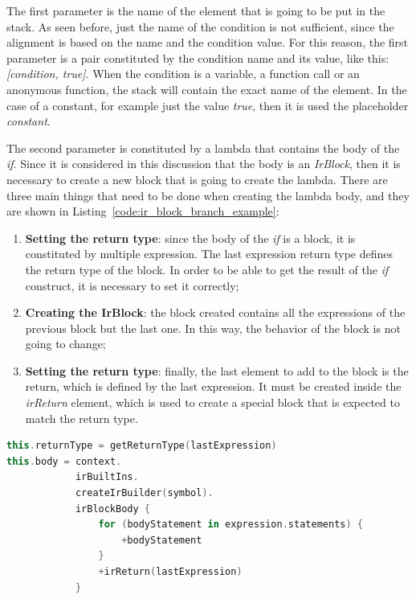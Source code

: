 The first parameter is the name of the element that is going to be put in the stack. As seen before, just the name of the condition is not sufficient, since the alignment is based on the name and the condition value. For this reason, the first parameter is a pair constituted by the condition name and its value, like this: \textit{[condition, true]}.\newline
When the condition is a variable, a function call or an anonymous function, the stack will contain the exact name of the element. In the case of a constant, for example just the value \textit{true}, then it is used the placeholder \textit{constant}.

The second parameter is constituted by a lambda that contains the body of the \textit{if}. Since it is considered in this discussion that the body is an \textit{IrBlock}, then it is necessary to create a new block that is going to create the lambda.\newline
There are three main things that need to be done when creating the lambda body, and they are shown in Listing~\ref{code:ir_block_branch_example}:
\begin{enumerate}
    \item \textbf{Setting the return type}: since the body of the \textit{if} is a block, it is constituted by multiple expression. The last expression return type defines the return type of the block. In order to be able to get the result of the \textit{if} construct, it is necessary to set it correctly;
    \item \textbf{Creating the IrBlock}: the block created contains all the expressions of the previous block but the last one. In this way, the behavior of the block is not going to change;
    \item \textbf{Setting the return type}: finally, the last element to add to the block is the return, which is defined by the last expression. It must be created inside the \textit{irReturn} element, which is used to create a special block that is expected to match the return type.
\end{enumerate}
\begin{lstlisting}[caption={Creation of the lambda body when modifying a \textit{IrBranch}}, captionpos=b, language=Kotlin, label={code:ir_block_branch_example}]
this.returnType = getReturnType(lastExpression)
this.body = context.
            irBuiltIns.
            createIrBuilder(symbol).
            irBlockBody {
                for (bodyStatement in expression.statements) { 
                    +bodyStatement 
                }
                +irReturn(lastExpression)
            }
\end{lstlisting}

